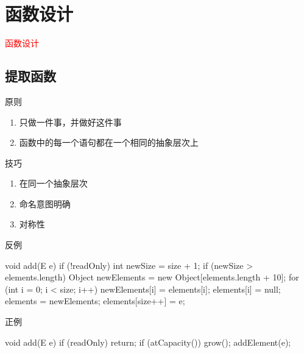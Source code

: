\section{函数设计}
\label{sec:function}

\begin{frame}
  \begin{center}
    \Huge{\textcolor{red}{函数设计}}
  \end{center}
\end{frame}

\subsection{提取函数}

\begin{frame}[fragile]{原则}
\begin{enumerate}
  \item 只做一件事，并做好这件事
  \item 函数中的每一个语句都在一个相同的抽象层次上
\end{enumerate}
\end{frame}

\begin{frame}[fragile]{技巧}
\begin{enumerate}
  \item 在同一个抽象层次
  \item 命名意图明确
  \item 对称性
\end{enumerate}
\end{frame}

\begin{frame}[fragile]{反例}
  \begin{java}
void add(E e) {
  if (!readOnly) {
    int newSize = size + 1;
    if (newSize > elements.length) {
      Object newElements = new Object[elements.length + 10];
      for (int i = 0; i < size; i++) {
        newElements[i] = elements[i];
        elements[i] = null;
      }
      elements = newElements;
    }
    elements[size++] = e;
  }
}
  \end{java}
\end{frame}

\begin{frame}[fragile]{正例}
  \begin{java}
void add(E e) {
  if (readOnly) 
    return;
  if (atCapacity()) 
    grow();
  addElement(e);
}
  \end{java}
\end{frame}

